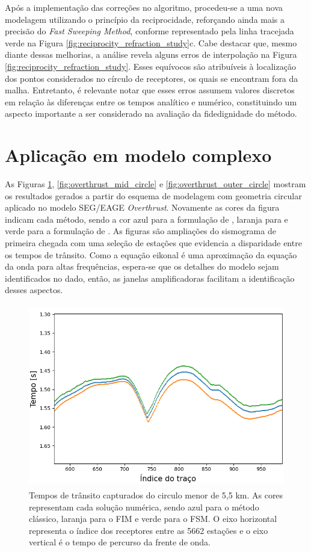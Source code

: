 Após a implementação das correções no algoritmo, procedeu-se a uma nova modelagem utilizando o princípio da reciprocidade, reforçando ainda mais a precisão do \textit{Fast Sweeping Method}, conforme representado pela linha tracejada verde na Figura \ref{fig:reciprocity_refraction_study}c. Cabe destacar que, mesmo diante dessas melhorias, a análise revela alguns erros de interpolação na Figura \ref{fig:reciprocity_refraction_study}. Esses equívocos são atribuíveis à localização dos pontos considerados no círculo de receptores, os quais se encontram fora da malha. Entretanto, é relevante notar que esses erros assumem valores discretos em relação às diferenças entre os tempos analítico e numérico, constituindo um aspecto importante a ser considerado na avaliação da fidedignidade do método.

\section{Aplicação em modelo complexo}

As Figuras \ref{fig:overthrust_inner_circle}, \ref{fig:overthrust_mid_circle} e \ref{fig:overthrust_outer_circle} mostram os resultados gerados a partir do esquema de modelagem com geometria circular aplicado no modelo SEG/EAGE \textit{Overthrust}. Novamente as cores da figura indicam cada método, sendo a cor azul para a formulação de , laranja para  e verde para a formulação de . As figuras são ampliações do sismograma de primeira chegada com uma seleção de estações que evidencia a disparidade entre os tempos de trânsito. Como a equação eikonal é uma aproximação da equação da onda para altas frequências, espera-se que os detalhes do modelo sejam identificados no dado, então, as janelas amplificadoras facilitam a identificação desses aspectos.    

\begin{figure}[H]
	\centering
	\includegraphics[height=8cm,width=13cm]{Imgs/Resultados/complex_w1.png}		
	\caption{Tempos de trânsito capturados do circulo menor de 5,5 km. As cores representam cada solução numérica, sendo azul para o método clássico, laranja para o FIM e verde para o FSM. O eixo horizontal representa o índice dos receptores entre as 5662 estações e o eixo vertical é o tempo de percurso da frente de onda.}
	\label{fig:overthrust_inner_circle}
\end{figure}

